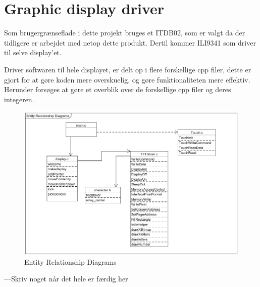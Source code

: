 \graphicspath{{Chapters/Struktur/}}

\section{Graphic display driver}

Som brugergrænseflade i dette projekt bruges et ITDB02, som er valgt da der tidligere er arbejdet med netop dette produkt. Dertil kommer ILI9341 som driver til selve display'et. 

Driver softwaren til hele displayet, er delt op i flere forskellige cpp filer, dette er gjort for at gøre koden mere overskuelig, og gøre funktionaliteten mere effektiv. Herunder forsøges at gøre et overblik over de forskellige cpp filer og deres integeren. 


\begin{figure}[H]
	\centering
	\includegraphics[width = 300 pt]{Img/Entity.png}
	\caption{Entity Relationship Diagrams}
	\label{fig:Konceptbillede}
\end{figure}
 
---Skriv noget når det hele er færdig her



